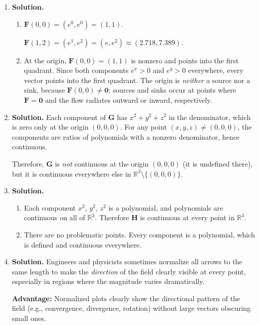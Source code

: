 \begin{enumerate}
\item \textbf{Solution.}
\begin{enumerate}
\item $\mathbf{F}(0,0) = (e^0, e^0) = (1,1)$.

$\mathbf{F}(1,2) = (e^1, e^2) = (e, e^2) \approx (2.718, 7.389)$.

\item At the origin, $\mathbf{F}(0,0)=(1,1)$ is nonzero and points into the first quadrant. Since both components $e^x > 0$ and $e^y > 0$ everywhere, every vector points into the first quadrant. The origin is \emph{neither} a source nor a sink, because $\mathbf{F}(0,0)\neq\mathbf{0}$; sources and sinks occur at points where $\mathbf{F}=\mathbf{0}$ and the flow radiates outward or inward, respectively.
\end{enumerate}

\item \textbf{Solution.}
Each component of $\mathbf{G}$ has $x^2+y^2+z^2$ in the denominator, which is zero only at the origin $(0,0,0)$. For any point $(x,y,z)\neq(0,0,0)$, the components are ratios of polynomials with a nonzero denominator, hence continuous.

Therefore, $\mathbf{G}$ is \emph{not} continuous at the origin $(0,0,0)$ (it is undefined there), but it is continuous everywhere else in $\mathbb{R}^3\setminus\{(0,0,0)\}$.

\item \textbf{Solution.}
\begin{enumerate}
\item Each component $x^2$, $y^2$, $z^2$ is a polynomial, and polynomials are continuous on all of $\mathbb{R}^3$. Therefore $\mathbf{H}$ is continuous at every point in $\mathbb{R}^3$.

\item There are no problematic points. Every component is a polynomial, which is defined and continuous everywhere.
\end{enumerate}

\item \textbf{Solution.}
Engineers and physicists sometimes normalize all arrows to the same length to make the \emph{direction} of the field clearly visible at every point, especially in regions where the magnitude varies dramatically.

\textbf{Advantage:} Normalized plots clearly show the directional pattern of the field (e.g., convergence, divergence, rotation) without large vectors obscuring small ones.


\end{enumerate}

